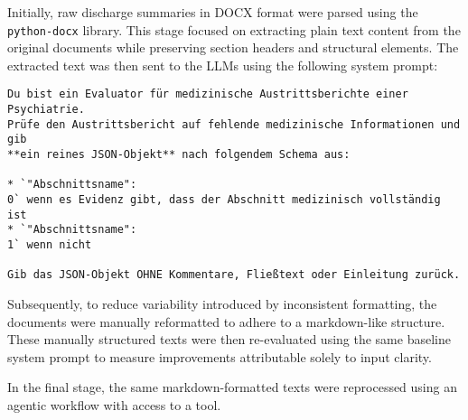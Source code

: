 Initially, raw discharge summaries in DOCX format were parsed 
using the \texttt{python-docx} library. This stage focused on extracting 
plain text content from the original documents while preserving section 
headers and structural elements. The extracted text was then sent to the LLMs
using the following system prompt:
\begin{verbatim}
Du bist ein Evaluator für medizinische Austrittsberichte einer Psychiatrie.
Prüfe den Austrittsbericht auf fehlende medizinische Informationen und gib
**ein reines JSON-Objekt** nach folgendem Schema aus:

* `"Abschnittsname": 
0` wenn es Evidenz gibt, dass der Abschnitt medizinisch vollständig ist
* `"Abschnittsname": 
1` wenn nicht

Gib das JSON-Objekt OHNE Kommentare, Fließtext oder Einleitung zurück.
\end{verbatim}

Subsequently, to reduce variability introduced by inconsistent formatting, 
the documents were manually reformatted to adhere to a markdown-like structure. 
These manually structured texts were then re-evaluated using the same baseline 
system prompt to measure improvements attributable solely to input clarity.

In the final stage, the same markdown-formatted texts were reprocessed using 
an agentic workflow with access to a tool. 

